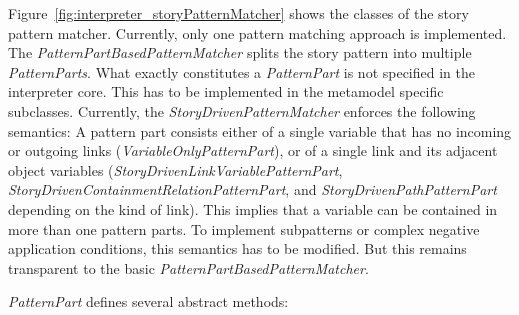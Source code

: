 Figure~\ref{fig:interpreter_storyPatternMatcher} shows the classes of the story pattern matcher. 
Currently, only one pattern matching approach is implemented. 
The \emph{PatternPartBasedPatternMatcher} splits the story pattern into multiple \emph{PatternParts}. 
What exactly constitutes a \emph{PatternPart} is not specified in the interpreter core. 
This has to be implemented in the metamodel specific subclasses. 
Currently, the \emph{StoryDrivenPatternMatcher} enforces the following semantics: A pattern part consists either of a single variable that has no incoming or outgoing links (\emph{VariableOnlyPatternPart}), or of a single link and its adjacent object variables (\emph{StoryDrivenLinkVariablePatternPart}, \emph{StoryDrivenContainmentRelationPatternPart}, and \emph{StoryDrivenPathPatternPart} depending on the kind of link). 
This implies that a variable can be contained in more than one pattern parts. 
To implement subpatterns or complex negative application conditions, this semantics has to be modified. 
But this remains transparent to the basic \emph{PatternPartBasedPatternMatcher}.

\emph{PatternPart} defines several abstract methods:

